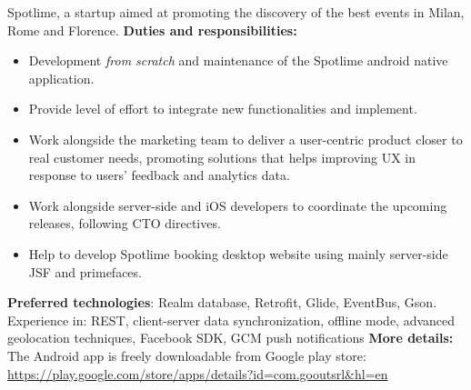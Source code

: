 \begin{cventries}
{   Spotlime, a startup aimed  at promoting  the 
   discovery of the best events in Milan, Rome and Florence. 
   \newline
   \textbf{Duties and responsibilities:}
   \begin{itemize}
      \item Development \emph{from scratch} and maintenance of the Spotlime android
	 native application.
      \item Provide level of effort to integrate new functionalities and
	implement. 
      \item 
   Work alongside the marketing team to deliver a user-centric product closer
   to real customer 
   needs, promoting solutions that helps improving UX in response
   to users' feedback and analytics data.
      \item 
   Work alongside server-side and iOS developers to coordinate the upcoming
   releases, following CTO directives.
\item Help to develop Spotlime booking desktop website using mainly server-side JSF and
   primefaces.
\end{itemize}
\textbf{Preferred technologies}: Realm database, Retrofit, Glide, EventBus,
Gson.
   Experience in: REST, client-server data synchronization, offline mode,
   advanced geolocation techniques, Facebook SDK, GCM push notifications
   \newline
   \textbf{More details:}
   The Android app is freely downloadable from Google play store: 
   \url{https://play.google.com/store/apps/details?id=com.gooutsrl&hl=en}
}


\end{cventries}
